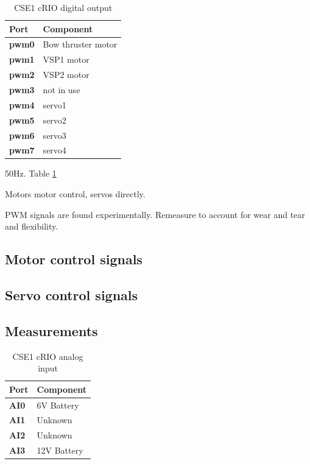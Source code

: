 \documentclass[a4paper,twoside,english]{report}
\providecommand{\tabularnewline}{\\}
\begin{document}
\begin{table}[h!]
\begin{centering}
\begin{tabular}{>{\bfseries}ll}
\toprule 
Port & Component\tabularnewline
\midrule 
pwm0 & Bow thruster motor\tabularnewline
pwm1 & VSP1 motor\tabularnewline
pwm2 & VSP2 motor\tabularnewline
pwm3 & not in use\tabularnewline
pwm4 & servo1\tabularnewline
pwm5 & servo2\tabularnewline
pwm6 & servo3\tabularnewline
pwm7 & servo4\tabularnewline
\bottomrule
\end{tabular}\caption{CSE1 cRIO digital output}
\par\end{centering}
\centering{}\label{tab: CSE1 cRIO digital out} 
\end{table}

50Hz. Table \ref{tab: CSE1 cRIO digital out}

Motors motor control, servos directly.

PWM signals are found experimentally. Remeasure to account for wear
and tear and flexibility.

\subsection{Motor control signals}

\subsection{Servo control signals}

\subsection{Measurements}

\begin{table}[h!]
\begin{centering}
\begin{tabular}{>{\bfseries}ll}
\toprule 
Port & Component\tabularnewline
\midrule 
AI0 & 6V Battery\tabularnewline
AI1 & Unknown\tabularnewline
AI2 & Unknown\tabularnewline
AI3 & 12V Battery\tabularnewline
\bottomrule
\end{tabular}\caption{CSE1 cRIO analog input}
\par\end{centering}
\centering{}\label{tab: CSE1 analog inputs} 
\end{table}

\FloatBarrier

\newpage{}
\end{document}
